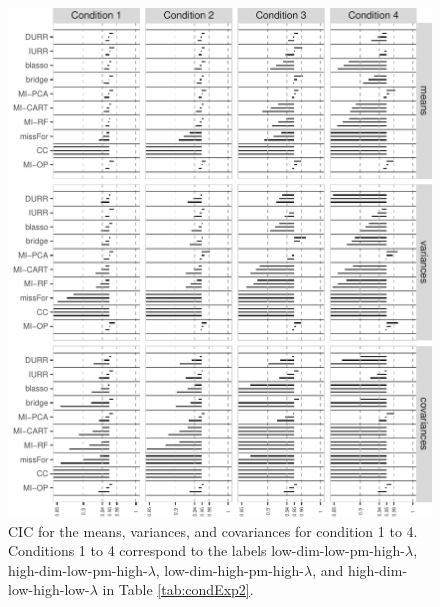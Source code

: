 \begin{figure}
	\includegraphics{../../output/graphs/exp2_semR_ci_14_summy.pdf}
\caption{CIC for the means, variances, and covariances for condition 1 to 4.
	Conditions 1 to 4 correspond to the labels low-dim-low-pm-high-$\lambda$, high-dim-low-pm-high-$\lambda$, 
	low-dim-high-pm-high-$\lambda$, and high-dim-low-high-low-$\lambda$ in Table \ref{tab:condExp2}.
}
\label{fig:exp2cir14}
\end{figure}

